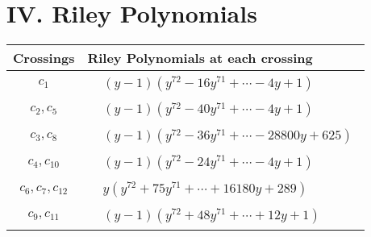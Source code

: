 \documentclass[1p]{elsarticle_modified}
\theoremstyle{definition}
\begin{document}
\centering \section*{ IV. Riley Polynomials}
\begin{tabular}{m{50pt}|m{274pt}}
Crossings & \hspace{64pt}Riley Polynomials at each crossing \\
\hline $$\begin{aligned}c_{1}\end{aligned}$$&$\begin{aligned}
&(y-1)(y^{72}-16 y^{71}+\cdots-4 y+1)
\end{aligned}$\\
\hline $$\begin{aligned}c_{2},c_{5}\end{aligned}$$&$\begin{aligned}
&(y-1)(y^{72}-40 y^{71}+\cdots-4 y+1)
\end{aligned}$\\
\hline $$\begin{aligned}c_{3},c_{8}\end{aligned}$$&$\begin{aligned}
&(y-1)(y^{72}-36 y^{71}+\cdots-28800 y+625)
\end{aligned}$\\
\hline $$\begin{aligned}c_{4},c_{10}\end{aligned}$$&$\begin{aligned}
&(y-1)(y^{72}-24 y^{71}+\cdots-4 y+1)
\end{aligned}$\\
\hline $$\begin{aligned}c_{6},c_{7},c_{12}\end{aligned}$$&$\begin{aligned}
&y(y^{72}+75 y^{71}+\cdots+16180 y+289)
\end{aligned}$\\
\hline $$\begin{aligned}c_{9},c_{11}\end{aligned}$$&$\begin{aligned}
&(y-1)(y^{72}+48 y^{71}+\cdots+12 y+1)
\end{aligned}$\\
\hline
\end{tabular}
\vskip 2pc
\end{document}
